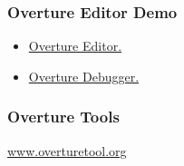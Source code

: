 \documentclass[slidestop,uncompress,mathserif,notes]{beamer}
\begin{document}
\frame
{
  \frametitle{Overture Editor Demo}

  \begin{itemize}
  \item<1-> \href{http://mt.lausdahl.com/downloads/ScreenCasts/CreateProjectWithOutline/}{Overture Editor.}
  \item<2-> \href{http://mt.lausdahl.com/downloads/ScreenCasts/DemoOvertureDebugger/}{Overture Debugger.}     

  \end{itemize}
}


\frame
{
  \frametitle{Overture Tools}

\begin{center}
\href{www.overturetool.org}{www.overturetool.org}
\end{center}

}
\end{document}
